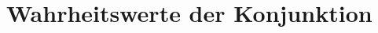 \documentclass[main.tex]{subfiles}
\begin{document}
\FormulaThmAuto{\neg\bot \eqvdash \top}
\begin{tabproofsplit}
  \proofpart{$\vdash$}
  \closeproofpart

  \proofpart{$\dashv$}
  \closeproofpart
\end{tabproofsplit}

\section{Wahrheitswerte der Konjunktion}

\FormulaThmAuto{\top\land \top \eqvdash \top}
\begin{tabproofsplit}
  \proofpart{$\vdash$}
  \closeproofpart

  \proofpart{$\dashv$}
  \closeproofpart
\end{tabproofsplit}

\FormulaThmAuto{\top\land \bot \eqvdash \bot}
\begin{tabproofsplit}
  \proofpart{$\vdash$}
  \closeproofpart

  \proofpart{$\dashv$}
    \proofstep{}{\top}{\FormulaRefAuto{\top}}
  \closeproofpart
\end{tabproofsplit}

\FormulaThmAuto{\bot\land \top \eqvdash \bot}
\begin{tabproofsplit}
  \proofpart{$\vdash$}
  \closeproofpart

  \proofpart{$\dashv$}
    \proofstep{}{\top}{\FormulaRefAuto{\top}}
  \closeproofpart
\end{tabproofsplit}

\FormulaThmAuto{\bot\land \bot \eqvdash \bot}
\begin{tabproofsplit}
  \proofpart{$\vdash$}
  \closeproofpart

  \proofpart{$\dashv$}
  \closeproofpart
\end{tabproofsplit}
\end{document}
